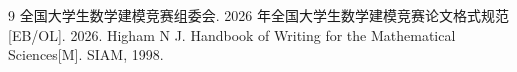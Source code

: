 \begin{thebibliography}{9}
全国大学生数学建模竞赛组委会. 2026 年全国大学生数学建模竞赛论文格式规范[EB/OL]. 2026.
Higham N J. Handbook of Writing for the Mathematical Sciences[M]. SIAM, 1998.
\end{thebibliography}
